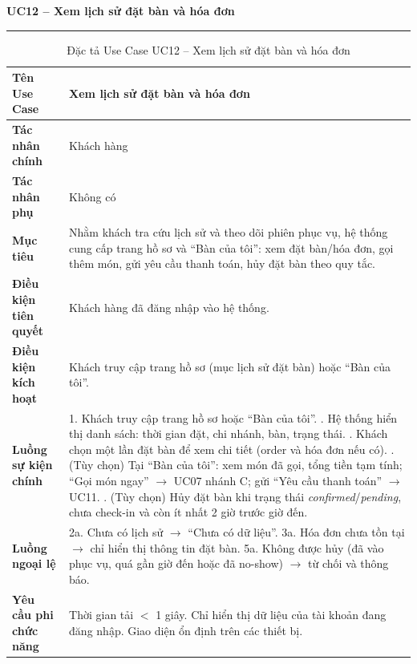 ﻿\documentclass[../DoAn.tex]{subfiles}
\newcommand{\UCtitle}[1]{%
    \vspace{0.5em}
    {\large\bfseries #1}\\[-0.5em]
    \rule{\textwidth}{0.5pt}
    \vspace{0.3em}
}
\begin{document}
\begin{table}[H]
\UCtitle{UC12 – Xem lịch sử đặt bàn và hóa đơn}
\centering
\begin{tabular}{|p{4cm}|p{10.2cm}|}
\hline
\textbf{Tên Use Case} & Xem lịch sử đặt bàn và hóa đơn \\ \hline
\textbf{Tác nhân chính} & Khách hàng \\ \hline
\textbf{Tác nhân phụ} & Không có \\ \hline
\textbf{Mục tiêu} &
Nhằm khách tra cứu lịch sử và theo dõi phiên phục vụ, hệ thống cung cấp trang hồ sơ và ``Bàn của tôi'': xem đặt bàn/hóa đơn, gọi thêm món, gửi yêu cầu thanh toán, hủy đặt bàn theo quy tắc.
\\ \hline
\textbf{Điều kiện tiên quyết} & Khách hàng đã đăng nhập vào hệ thống. \\ \hline
\textbf{Điều kiện kích hoạt} & Khách truy cập trang hồ sơ (mục lịch sử đặt bàn) hoặc ``Bàn của tôi''. \\ \hline
\textbf{Luồng sự kiện chính} &
1. Khách truy cập trang hồ sơ hoặc ``Bàn của tôi''. \newline
2. Hệ thống hiển thị danh sách: thời gian đặt, chi nhánh, bàn, trạng thái. \newline
3. Khách chọn một lần đặt bàn để xem chi tiết (order và hóa đơn nếu có). \newline
4. (Tùy chọn) Tại ``Bàn của tôi'': xem món đã gọi, tổng tiền tạm tính; ``Gọi món ngay'' $\rightarrow$ UC07 nhánh C; gửi ``Yêu cầu thanh toán'' $\rightarrow$ UC11. \newline
5. (Tùy chọn) Hủy đặt bàn khi trạng thái \textit{confirmed}/\textit{pending}, chưa check-in và còn ít nhất 2 giờ trước giờ đến.
\\ \hline
\textbf{Luồng ngoại lệ} &
2a. Chưa có lịch sử $\rightarrow$ ``Chưa có dữ liệu''. \newline
3a. Hóa đơn chưa tồn tại $\rightarrow$ chỉ hiển thị thông tin đặt bàn. \newline
5a. Không được hủy (đã vào phục vụ, quá gần giờ đến hoặc đã no-show) $\rightarrow$ từ chối và thông báo.
\\ \hline
\textbf{Yêu cầu phi chức năng} &
Thời gian tải $<$ 1 giây. Chỉ hiển thị dữ liệu của tài khoản đang đăng nhập. Giao diện ổn định trên các thiết bị.
\\ \hline
\end{tabular}
\caption{Đặc tả Use Case UC12 – Xem lịch sử đặt bàn và hóa đơn}
\end{table}
\end{document}
